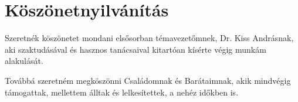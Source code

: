 \chapter*{Köszönetnyilvánítás}
\pagestyle{headings}

Szeretnék köszönetet mondani elsősorban témavezetőmnek, Dr. Kiss Andrásnak, aki szaktudásával és hasznos tanácsaival kitartóan kísérte végig munkám alakulását.

Továbbá szeretném megköszönni Családomnak és Barátaimnak, akik mindvégig támogattak, mellettem álltak és lelkesítettek, a nehéz időkben is.

